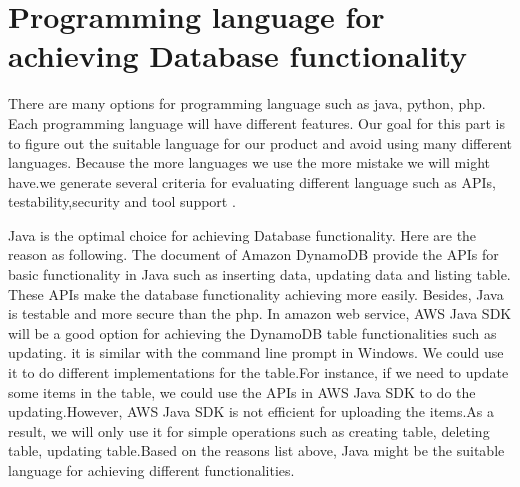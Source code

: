 \section{Programming language for achieving Database functionality}
        There are many options for programming language such as java, python, php. Each programming language will have different features. Our goal for this part is to figure out the suitable language for our product and avoid using many different languages. Because the more languages we use the more mistake we will might have.we generate several criteria for evaluating different language such as APIs, testability,security and tool support .

        \begin{table}[ht]
        \end{table}
                
        \noindent Java is the optimal choice for achieving Database functionality. Here are the reason as following. The document of Amazon DynamoDB provide the APIs for basic functionality in Java such as inserting data, updating data and listing table. These APIs make the database functionality achieving more easily. Besides, Java is testable and more secure than the php. In amazon web service, AWS Java SDK will be a good option for achieving the DynamoDB table functionalities such as updating.  it is similar with the command line prompt in Windows. We could use it to do different implementations for the table.For instance, if we need to update some items in the table, we could use the APIs in AWS Java SDK to do the updating.However, AWS Java SDK is not efficient for uploading the items.As a result, we will only use it for simple operations such as creating table, deleting table, updating table.Based on the reasons list above, Java might be the suitable language for achieving different functionalities.
